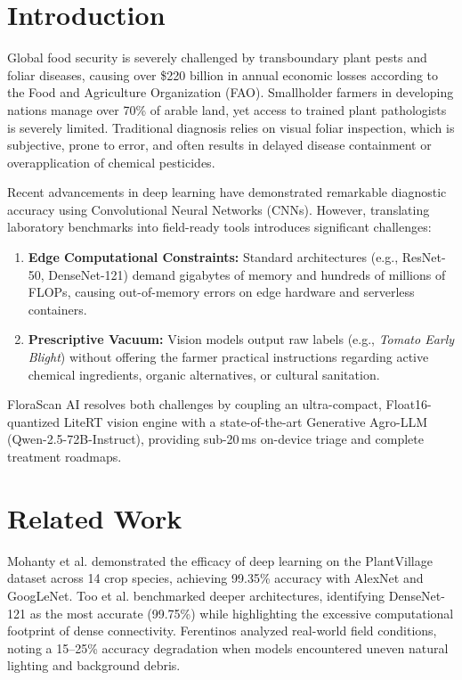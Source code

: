 \documentclass[conference]{IEEEtran}
\begin{document}
\section{Introduction}
Global food security is severely challenged by transboundary plant pests and foliar diseases, causing over \$220 billion in annual economic losses according to the Food and Agriculture Organization (FAO). Smallholder farmers in developing nations manage over 70\% of arable land, yet access to trained plant pathologists is severely limited. Traditional diagnosis relies on visual foliar inspection, which is subjective, prone to error, and often results in delayed disease containment or overapplication of chemical pesticides.

Recent advancements in deep learning have demonstrated remarkable diagnostic accuracy using Convolutional Neural Networks (CNNs). However, translating laboratory benchmarks into field-ready tools introduces significant challenges:
\begin{enumerate}
    \item \textbf{Edge Computational Constraints:} Standard architectures (e.g., ResNet-50, DenseNet-121) demand gigabytes of memory and hundreds of millions of FLOPs, causing out-of-memory errors on edge hardware and serverless containers.
    \item \textbf{Prescriptive Vacuum:} Vision models output raw labels (e.g., \textit{Tomato Early Blight}) without offering the farmer practical instructions regarding active chemical ingredients, organic alternatives, or cultural sanitation.
\end{enumerate}

FloraScan AI resolves both challenges by coupling an ultra-compact, Float16-quantized LiteRT vision engine with a state-of-the-art Generative Agro-LLM (Qwen-2.5-72B-Instruct), providing sub-20\,ms on-device triage and complete treatment roadmaps.

\section{Related Work}
Mohanty et al. demonstrated the efficacy of deep learning on the PlantVillage dataset across 14 crop species, achieving 99.35\% accuracy with AlexNet and GoogLeNet. Too et al. benchmarked deeper architectures, identifying DenseNet-121 as the most accurate (99.75\%) while highlighting the excessive computational footprint of dense connectivity. Ferentinos analyzed real-world field conditions, noting a 15--25\% accuracy degradation when models encountered uneven natural lighting and background debris.
\end{document}
